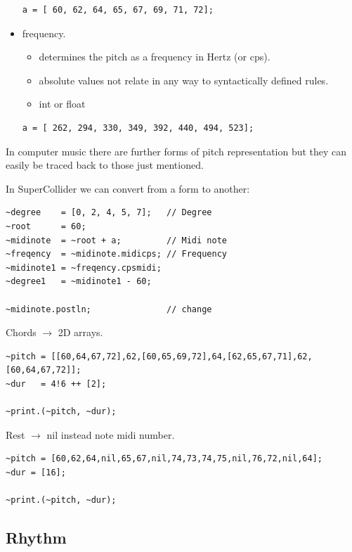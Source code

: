 \begin{itemize}
\begin{lstlisting}[frame=single] 
a = [ 60, 62, 64, 65, 67, 69, 71, 72];
\end{lstlisting}

\item frequency.
  \begin{itemize}
  \tightlist
  \item determines the pitch as a frequency in Hertz (or cps).
  \item absolute values not relate in any way to syntactically defined rules.
  \item int or float
  \end{itemize}

\begin{lstlisting}[frame=single] 
a = [ 262, 294, 330, 349, 392, 440, 494, 523]; 
\end{lstlisting}
\end{itemize}

In computer music there are further forms of pitch representation but they can easily be traced back to those just mentioned.

In SuperCollider we can convert from a form to another:

\begin{lstlisting}[frame=single] 
~degree    = [0, 2, 4, 5, 7];   // Degree
~root      = 60;
~midinote  = ~root + a;         // Midi note   
~freqency  = ~midinote.midicps; // Frequency
~midinote1 = ~freqency.cpsmidi;
~degree1   = ~midinote1 - 60;

~midinote.postln;               // change
\end{lstlisting}

Chords \(\rightarrow\) 2D arrays.

\begin{lstlisting}[frame=single] 
~pitch = [[60,64,67,72],62,[60,65,69,72],64,[62,65,67,71],62,[60,64,67,72]];
~dur   = 4!6 ++ [2];

~print.(~pitch, ~dur);
\end{lstlisting}

Rest \(\rightarrow\) nil instead note midi number.

\begin{lstlisting}[frame=single] 
~pitch = [60,62,64,nil,65,67,nil,74,73,74,75,nil,76,72,nil,64];
~dur = [16];

~print.(~pitch, ~dur);
\end{lstlisting}

\subsection{Rhythm}\label{rhythm}

